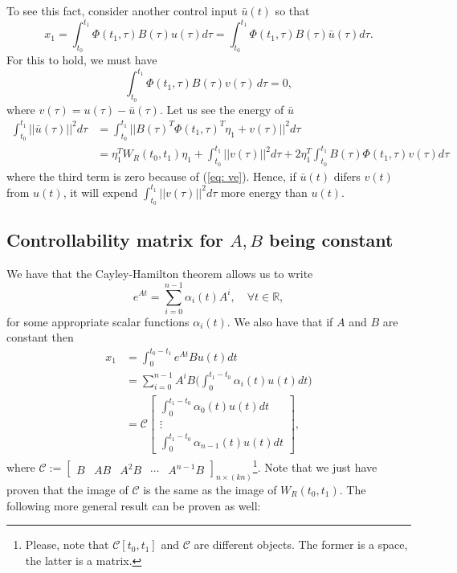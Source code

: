 \documentclass[11pt,a4paper,titlepage]{article}
\begin{document}
To see this fact, consider another control input $\bar u(t)$ so that
\begin{equation}
x_1 = \int_{t_0}^{t_1} \Phi(t_1,\tau)B(\tau)u(\tau)d\tau = \int_{t_0}^{t_1} \Phi(t_1,\tau)B(\tau)\bar u(\tau)d\tau.
\end{equation}
For this to hold, we must have
\begin{equation}
	\int_{t_0}^{t_1} \Phi(t_1,\tau)B(\tau)v(\tau) \, d\tau = 0,
	\label{eq: ve}
\end{equation}
where $v(\tau) = u(\tau) - \bar u(\tau)$.
Let us see the energy of $\bar u$
\begin{align}
\int_{t_0}^{t_1}||\bar u(\tau)||^2 d\tau &= \int_{t_0}^{t_1} || B(\tau)^T\Phi(t_1,\tau)^T \eta_1 + v(\tau)||^2 d\tau \nonumber \\ 
&= \eta_1^T W_R(t_0,t_1)\eta_1 + \int_{t_0}^{t_1} ||v(\tau)||^2 d \tau + 2\eta_1^T \int_{t_0}^{t_1}B(\tau)\Phi(t_1,\tau)v(\tau) d \tau
\end{align}
where the third term is zero because of (\ref{eq: ve}). Hence, if $\bar u(t)$ difers $v(t)$ from $u(t)$, it will expend $\int_{t_0}^{t_1} ||v(\tau)||^2 d\tau$ more energy than $u(t)$.

\subsection{Controllability matrix for $A,B$ being constant}

We have that the Cayley-Hamilton theorem allows us to write
\begin{equation}
	e^{At} = \sum_{i=0}^{n-1}\alpha_i(t)A^i, \quad \forall t\in\mathbb{R},
\end{equation}
for some appropriate scalar functions $\alpha_i(t)$. We also have that if $A$ and $B$ are constant then
\begin{align}
	x_1 &= \int_{0}^{t_0-t_1} e^{At}Bu(t) dt \nonumber \\
	&= \sum_{i=0}^{n-1} A^iB \Big(\int_{0}^{t_1-t_0}\alpha_i(t)u(t)dt \Big) \nonumber \\
	&= \mathcal{C} \begin{bmatrix}\int_{0}^{t_1-t_0}\alpha_0(t)u(t)dt \\ \vdots \\ \int_{0}^{t_1-t_0} \alpha_{n-1}(t)u(t)dt \end{bmatrix},
\end{align}
where $\mathcal{C}:=\begin{bmatrix}B & AB & A^2B & \cdots & A^{n-1}B
\end{bmatrix}_{n\times (kn)}$\footnote{Please, note that $\mathcal{C}[t_0,t_1]$ and $\mathcal{C}$ are different objects. The former is a space, the latter is a matrix.}.
Note that we just have proven that the image of $\mathcal{C}$ is the same as the image of $W_R(t_0,t_1)$. The following more general result can be proven as well:
\end{document}
